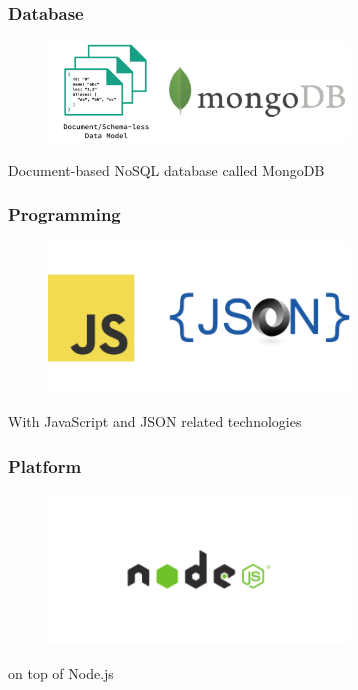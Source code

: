 \documentclass[10pt, compress]{beamer}
\begin{document}

\begin{frame}[fragile]
  \frametitle{Database}
  \centering

  \begin{figure}[ht]
    \includegraphics[width=8cm]{include/literature-database.png}
  \end{figure}

  Document-based \alert{NoSQL} database called \alert{MongoDB}

\end{frame}


\begin{frame}[fragile]
  \frametitle{Programming}
  \centering

  \begin{figure}[ht]
    \includegraphics[width=8cm]{include/literature-programming.png}
  \end{figure}

  With \alert{JavaScript} and \alert{JSON} related technologies

\end{frame}


\begin{frame}[fragile]
  \frametitle{Platform}
  \centering

  \begin{figure}[ht]
    \includegraphics[width=8cm]{include/literature-platform.png}
  \end{figure}

  on top of \alert{Node.js}

\end{frame}
\end{document}
